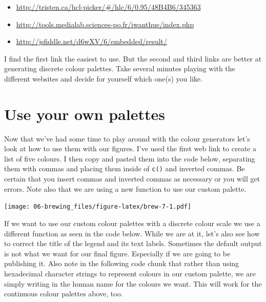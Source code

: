 \documentclass[]{book}
\newenvironment{Shaded}{\begin{snugshade}}{\end{snugshade}}
\newcommand{\KeywordTok}[1]{\textcolor[rgb]{0.13,0.29,0.53}{\textbf{#1}}}
\newcommand{\DataTypeTok}[1]{\textcolor[rgb]{0.13,0.29,0.53}{#1}}
\newcommand{\StringTok}[1]{\textcolor[rgb]{0.31,0.60,0.02}{#1}}
\newcommand{\OperatorTok}[1]{\textcolor[rgb]{0.81,0.36,0.00}{\textbf{#1}}}
\newcommand{\NormalTok}[1]{#1}
\providecommand{\tightlist}{%
  \setlength{\itemsep}{0pt}\setlength{\parskip}{0pt}}
\theoremstyle{definition}
\theoremstyle{definition}
\theoremstyle{definition}
\theoremstyle{remark}
\begin{document}
\begin{itemize}
\tightlist
\item
  \url{http://tristen.ca/hcl-picker/\#/hlc/6/0.95/48B4B6/345363}
\item
  \url{http://tools.medialab.sciences-po.fr/iwanthue/index.php}
\item
  \url{http://jsfiddle.net/d6wXV/6/embedded/result/}
\end{itemize}

I find the first link the easiest to use. But the second and third links
are better at generating discrete colour palettes. Take several minutes
playing with the different websites and decide for yourself which one(s)
you like.

\section{Use your own palettes}\label{use-your-own-palettes}

Now that we've had some time to play around with the colour generators
let's look at how to use them with our figures. I've used the first web
link to create a list of five colours. I then copy and pasted them into
the code below, separating them with commas and placing them inside of
\texttt{c()} and inverted commas. Be certain that you insert commas and
inverted commas as necessary or you will get errors. Note also that we
are using a new function to use our custom palette.

\begin{Shaded}
\end{Shaded}

\texttt{[image: 06-brewing\_files/figure-latex/brew-7-1.pdf]}

If we want to use our custom colour palettes with a discrete colour
scale we use a different function as seen in the code below. While we
are at it, let's also see how to correct the title of the legend and its
text labels. Sometimes the default output is not what we want for our
final figure. Especially if we are going to be publishing it. Also note
in the following code chunk that rather than using hexadecimal character
strings to represent colours in our custom palette, we are simply
writing in the human name for the colours we want. This will work for
the continuous colour palettes above, too.
\end{document}
